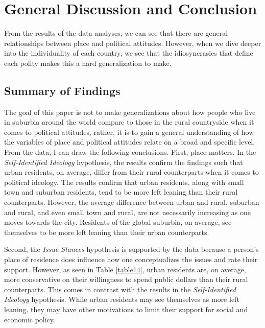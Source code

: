 \documentclass[12pt, titlepage]{article}
\newcommand\e{\emph}
\begin{document}
\section{General Discussion and Conclusion}

From the results of the data analyses, we can see that there are general relationships between place and political attitudes. However, when we dive deeper into the individuality of each country, we see that the idiosyncrasies that define each polity makes this a hard generalization to make. 

\subsection{Summary of Findings}

The goal of this paper is not to make generalizations about how people who live in suburbia around the world compare to those in the rural countryside when it comes to political attitudes, rather, it is to gain a general understanding of how the variables of place and political attitudes relate on a broad and specific level. From the data, I can draw the following conclusions. First, place matters. In the \e{Self-Identified Ideology} hypothesis, the results confirm the findings such that urban residents, on average, differ from their rural counterparts when it comes to political ideology. The results confirm that urban residents, along with small town and suburban residents, tend to be more left leaning than their rural counterparts. However, the average difference between urban and rural, suburban and rural, and even small town and rural, are not necessarily increasing as one moves towards the city. Residents of the global suburbia, on average, see themselves to be more left leaning than their urban counterparts.

Second, the \e{Issue Stances} hypothesis is supported by the data because a person's place of residence does influence how one conceptualizes the issues and rate their support. However, as seen in Table \ref{table14}, urban residents are, on average, more conservative on their willingness to spend public dollars than their rural counterparts. This comes in contrast with the results in the \e{Self-Identified Ideology} hypothesis. While urban residents may see themselves as more left leaning, they may have other motivations to limit their support for social and economic policy.
\end{document}
